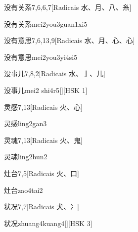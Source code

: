 \begin{entry}{没有关系}{7,6,6,7}[Radicais ⽔、⽉、⼋、⽷]
  \begin{phonetics}{没有关系}{mei2you3guan1xi5}
  \end{phonetics}
\end{entry}

\begin{entry}{没有意思}{7,6,13,9}[Radicais ⽔、⽉、⼼、⼼]
  \begin{phonetics}{没有意思}{mei2you3yi4si5}
  \end{phonetics}
\end{entry}

\begin{entry}{没事儿}{7,8,2}[Radicais ⽔、⼅、⼉]
  \begin{phonetics}{没事儿}{mei2 shi4r5}[][HSK 1]
  \end{phonetics}
\end{entry}

\begin{entry}{灵感}{7,13}[Radicais ⽕、⼼]
  \begin{phonetics}{灵感}{ling2gan3}
  \end{phonetics}
\end{entry}

\begin{entry}{灵魂}{7,13}[Radicais ⽕、⿁]
  \begin{phonetics}{灵魂}{ling2hun2}
  \end{phonetics}
\end{entry}

\begin{entry}{灶台}{7,5}[Radicais ⽕、⼝]
  \begin{phonetics}{灶台}{zao4tai2}
  \end{phonetics}
\end{entry}

\begin{entry}{状况}{7,7}[Radicais ⽝、⼎]
  \begin{phonetics}{状况}{zhuang4kuang4}[][HSK 3]
  \end{phonetics}
\end{entry}

